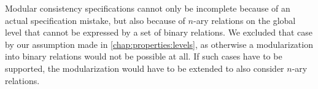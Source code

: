 Modular consistency specifications cannot only be incomplete because of an actual specification mistake, but also because of $n$-ary relations on the global level that cannot be expressed by a set of binary relations.
We excluded that case by our assumption made in \autoref{chap:properties:levels}, as otherwise a modularization into binary relations would not be possible at all.
If such cases have to be supported, the modularization would have to be extended to also consider $n$-ary relations.

